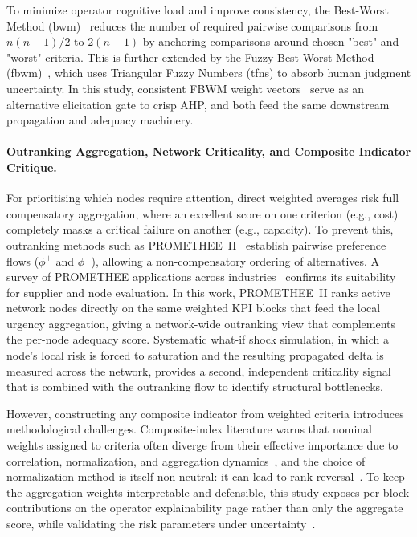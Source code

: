 To minimize operator cognitive load and improve consistency, the Best-Worst Method (\gls{bwm})~\autocite{rezaei2015best} reduces the number of required pairwise comparisons from $n(n-1)/2$ to $2(n-1)$ by anchoring comparisons around chosen "best" and "worst" criteria. This is further extended by the Fuzzy Best-Worst Method (\gls{fbwm})~\autocite{guo2017fuzzy,Yuc18,amiri2020new}, which uses Triangular Fuzzy Numbers (\glspl{tfn}) to absorb human judgment uncertainty. In this study, consistent FBWM weight vectors~\autocite{liang2020} serve as an alternative elicitation gate to crisp AHP, and both feed the same downstream propagation and adequacy machinery.

\paragraph{Outranking Aggregation, Network Criticality, and Composite Indicator Critique.}
For prioritising which nodes require attention, direct weighted averages risk full compensatory aggregation, where an excellent score on one criterion (e.g., cost) completely masks a critical failure on another (e.g., capacity). To prevent this, outranking methods such as PROMETHEE~II~\autocite{brans1986promethee,brans2005promethee} establish pairwise preference flows ($\phi^+$ and $\phi^-$), allowing a non-compensatory ordering of alternatives. A survey of PROMETHEE applications across industries~\autocite{behzadian2010promethee} confirms its suitability for supplier and node evaluation. In this work, PROMETHEE~II ranks active network nodes directly on the same weighted KPI blocks that feed the local urgency aggregation, giving a network-wide outranking view that complements the per-node adequacy score. Systematic what-if shock simulation, in which a node's local risk is forced to saturation and the resulting propagated delta is measured across the network, provides a second, independent criticality signal that is combined with the outranking flow to identify structural bottlenecks.

However, constructing any composite indicator from weighted criteria introduces methodological challenges. Composite-index literature warns that nominal weights assigned to criteria often diverge from their effective importance due to correlation, normalization, and aggregation dynamics~\autocite{greco2018,becker2017,borgonovo2021global}, and the choice of normalization method is itself non-neutral: it can lead to rank reversal~\autocite{triantaphyllou2000multi}. To keep the aggregation weights interpretable and defensible, this study exposes per-block contributions on the operator explainability page rather than only the aggregate score, while validating the risk parameters under uncertainty~\autocite{sawik2020risk}.

